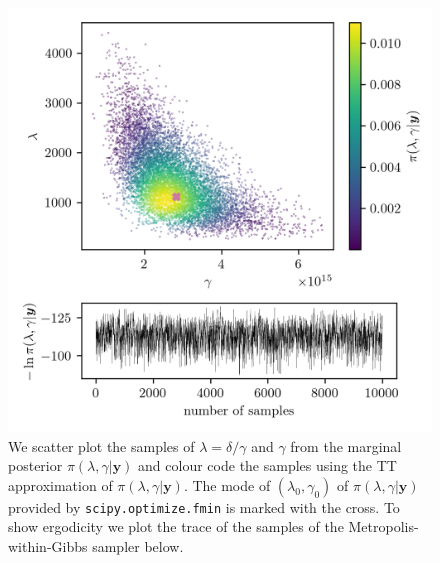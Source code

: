 \begin{figure}[ht!]
	\centering
	\includegraphics{ScatterplusHistoPlusTT.png}
	\caption[Scatter plot of samples from marginal posterior, including weighting from TT approximation; additional trace plot of the marginal posterior samples.]{We scatter plot the samples of $\lambda = \delta / \gamma $ and $\gamma$ from the marginal posterior $\pi(\lambda , \gamma  | \bm{y})$ and colour code the samples using the TT approximation of $\pi(\lambda , \gamma  | \bm{y})$. The mode of $(\lambda_0 , \gamma_0)$ of $\pi(\lambda , \gamma  | \bm{y})$ provided by \texttt{scipy.optimize.fmin} is marked with the cross. To show ergodicity we plot the trace of the samples of the Metropolis-within-Gibbs sampler below.}
	\label{fig:ScatterPlotTT}
\end{figure}

